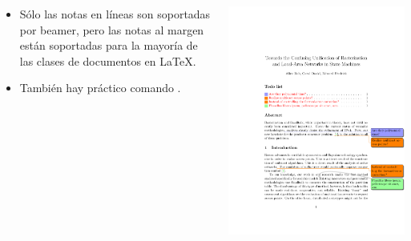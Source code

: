 \documentclass{beamer}
\begin{document}
\begin{frame}[fragile]{\insertsection}
  \begin{columns}
    \begin{column}{0.4\textwidth}
      \begin{itemize}
      \item Sólo las notas en líneas son soportadas por beamer, pero las
        notas al margen están soportadas para la mayoría de
        las clases de documentos en \LaTeX{}.
      \item También hay práctico comando  .
      \end{itemize}
    \end{column}
    \begin{column}{0.6\textwidth}
      \includegraphics[width=\textwidth,page=1]{todonotes-example}
    \end{column}
  \end{columns}
\end{frame}
\end{document}
